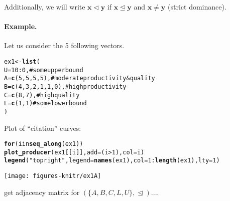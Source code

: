 \documentclass[11pt]{article}\usepackage{graphicx, color}
\makeatletter
\newcommand{\hlfunctioncall}[1]{\textcolor[rgb]{0.501960784313725,0,0.329411764705882}{\textbf{#1}}}%
\newcommand{\hlstring}[1]{\textcolor[rgb]{0.6,0.6,1}{#1}}%
\newcommand{\hlcomment}[1]{\textcolor[rgb]{0.180392156862745,0.6,0.341176470588235}{#1}}%
\newenvironment{kframe}{%
 \def\at@end@of@kframe{}%
 \ifinner\ifhmode%
  \def\at@end@of@kframe{\end{minipage}}%
  \begin{minipage}{\columnwidth}%
 \fi\fi%
 \def\FrameCommand##1{\hskip\@totalleftmargin \hskip-\fboxsep
 \colorbox{shadecolor}{##1}\hskip-\fboxsep
     \hskip-\linewidth \hskip-\@totalleftmargin \hskip\columnwidth}%
 \MakeFramed {\advance\hsize-\width
   \@totalleftmargin\z@ \linewidth\hsize
   \@setminipage}}%
 {\par\unskip\endMakeFramed%
 \at@end@of@kframe}
\newenvironment{knitrout}{}{} %
\newcommand{\vect}[1]{{\mathbf{#1}}}
\theoremstyle{remark}
\theoremstyle{definition}
\makeatother
\begin{document}
Additionally, we will write $\vect{x}\vartriangleleft\vect{y}$ if
$\vect{x}\trianglelefteq\vect{y}$ and $\vect{x}\neq\vect{y}$
(strict dominance).


\paragraph{Example.} Let us consider the 5 following vectors.


\begin{knitrout}\small
{}\color{fgcolor}\begin{kframe}
\begin{alltt}
ex1 <- \hlfunctioncall{list}(
   U = 10:0,           \hlcomment{# some upper bound}
   A = \hlfunctioncall{c}(5,5,5,5),     \hlcomment{# moderate productivity & quality}
   B = \hlfunctioncall{c}(4,3,2,1,1,0), \hlcomment{# high productivity}
   C = \hlfunctioncall{c}(8,7),         \hlcomment{# high quality}
   L = \hlfunctioncall{c}(1,1)          \hlcomment{# some lower bound}
)
\end{alltt}
\end{kframe}
\end{knitrout}


Plot of ``citation'' curves:

\begin{knitrout}\small
{}\color{fgcolor}\begin{kframe}
\begin{alltt}
\hlfunctioncall{for} (i in \hlfunctioncall{seq_along}(ex1))
\hlfunctioncall{plot_producer}(ex1[[i]], add=(i>1), col=i)
\hlfunctioncall{legend}(\hlstring{"topright"}, legend=\hlfunctioncall{names}(ex1), col=1:\hlfunctioncall{length}(ex1), lty=1)
\end{alltt}
\end{kframe}

{\centering \texttt{[image: figures-knitr/ex1A]} 

}



\end{knitrout}


get adjacency matrix for $(\{A, B, C, L, U\}, \trianglelefteq)$....
\end{document}
